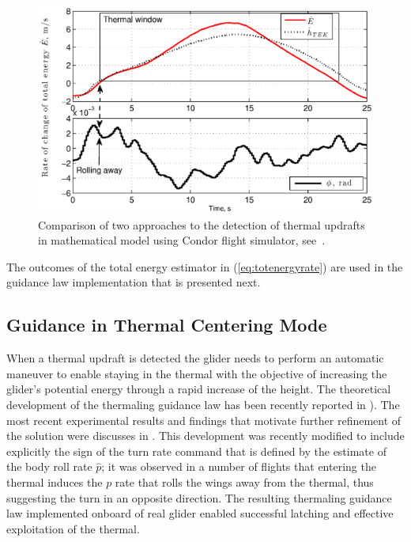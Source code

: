 \documentclass{ifacconf}
\begin{document}
\begin{figure}[thpb]
  \centering
  \includegraphics[scale=0.49]{Figures/TEK_Bank.eps}
  \caption{Comparison of two approaches to the detection of thermal updrafts in mathematical model using Condor flight simulator, see~\cite{Condor:2013:Online}. }
  \label{fig:ThermalDetection}
\end{figure}

The outcomes of the total energy estimator in (\ref{eq:totenergyrate}) are used in the guidance law implementation that is presented next.

\subsection{Guidance in Thermal Centering Mode}
\label{subsec:ThermGuidance}
When a thermal updraft is detected the glider needs to perform an automatic maneuver to enable staying in the thermal with the objective of increasing the glider's potential energy through a rapid increase of the height. The theoretical development of the thermaling guidance law has been recently reported in \cite{AKlass_JGCD:2012}). The most recent experimental results and findings that motivate further refinement of the solution were discusses in \cite{AKlass_CDC:2012}. This development was recently modified to include explicitly the sign of the turn rate command that is defined by the estimate of the body roll rate $\hat{p}$; it was observed in a number of flights that entering the thermal induces the $p$ rate that rolls the wings away from the thermal, thus suggesting the turn in an opposite direction. The resulting thermaling guidance law implemented onboard of real glider enabled successful latching and effective exploitation of the thermal.
\end{document}
